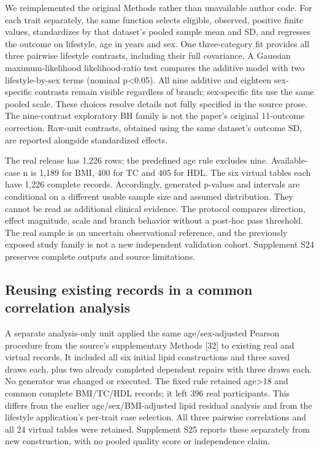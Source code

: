 \documentclass[11pt,letterpaper]{article}
\begin{document}
We reimplemented the original Methods rather than unavailable author code. For each trait separately, the same function selects eligible, observed, positive finite values, standardizes by that dataset's pooled sample mean and SD, and regresses the outcome on lifestyle, age in years and sex. One three-category fit provides all three pairwise lifestyle contrasts, including their full covariance. A Gaussian maximum-likelihood likelihood-ratio test compares the additive model with two lifestyle-by-sex terms (nominal p<0.05). All nine additive and eighteen sex-specific contrasts remain visible regardless of branch; sex-specific fits use the same pooled scale. These choices resolve details not fully specified in the source prose. The nine-contrast exploratory BH family is not the paper's original 11-outcome correction. Raw-unit contrasts, obtained using the same dataset's outcome SD, are reported alongside standardized effects.


The real release has 1,226 rows; the predefined age rule excludes nine. Available-case n is 1,189 for BMI, 400 for TC and 405 for HDL. The six virtual tables each have 1,226 complete records. Accordingly, generated p-values and intervals are conditional on a different usable sample size and assumed distribution. They cannot be read as additional clinical evidence. The protocol compares direction, effect magnitude, scale and branch behavior without a post-hoc pass threshold. The real sample is an uncertain observational reference, and the previously exposed study family is not a new independent validation cohort. Supplement S24 preserves complete outputs and source limitations.


\subsection{Reusing existing records in a common correlation analysis}

A separate analysis-only unit applied the same age/\allowbreak{}sex-adjusted Pearson procedure from the source's supplementary Methods [32] to existing real and virtual records. It included all six initial lipid constructions and three saved draws each, plus two already completed dependent repairs with three draws each. No generator was changed or executed. The fixed rule retained age>18 and common complete BMI/\allowbreak{}TC/\allowbreak{}HDL records; it left 396 real participants. This differs from the earlier age/\allowbreak{}sex/\allowbreak{}BMI-adjusted lipid residual analysis and from the lifestyle application's per-trait case selection. All three pairwise correlations and all 24 virtual tables were retained. Supplement S25 reports these separately from new construction, with no pooled quality score or independence claim.
\end{document}
